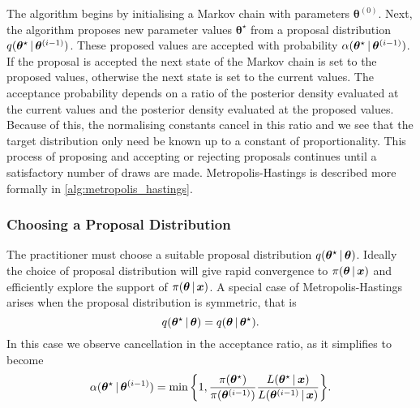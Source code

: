 The algorithm begins by initialising a Markov chain with parameters $\bm{\theta}^{(0)}$.
Next, the algorithm proposes new parameter values $\bm{\theta}^\star$ from a proposal
distribution $q(\bm{\theta}^\star \,|\, \bm{\theta}^{(i-1)})$. These proposed values are
accepted with probability $\alpha(\bm{\theta}^\star \,|\, \bm{\theta}^{(i-1)})$.  If the
proposal is accepted the next state of the Markov chain is set to the proposed values,
otherwise the next state is set to the current values.  The acceptance probability depends
on a ratio of the posterior density evaluated at the current values and the posterior
density evaluated at the proposed values.  Because of this, the normalising constants
cancel in this ratio and we see that the target distribution only need be
known up to a constant of proportionality.  This process of proposing and accepting or
rejecting proposals continues until a satisfactory number of draws are made.
Metropolis-Hastings is described more formally in \cref{alg:metropolis_hastings}.

\subsubsection{Choosing a Proposal Distribution}
\label{ssec:proposal_distribution}

The practitioner must choose a suitable proposal distribution $q(\bm{\theta}^\star \,|\,
\bm{\theta})$. Ideally the choice of proposal distribution will give rapid convergence to
$\pi(\bm{\theta} \,|\, \bm{x})$ and efficiently explore the support of $\pi(\bm{\theta}
\,|\, \bm{x})$. A special case of Metropolis-Hastings arises when the proposal
distribution is symmetric, that is
\begin{equation*}
  q(\bm{\theta}^\star \,|\, \bm{\theta}) = q(\bm{\theta} \,|\, \bm{\theta}^\star).
\end{equation*}
In this case we observe cancellation in the acceptance ratio, as it simplifies to become
\begin{equation*}
  \alpha({\bm{\theta}}^\star \given \bm{\theta}^{(i-1)})
    = \text{min}\,\bigg\{1,
                        \frac{\pi(\bm{\theta}^\star)}{\pi(\bm{\theta}^{(i-1)})}%
                        \frac{L(\bm{\theta}^\star \given \bm{x})}%
                        {L(\bm{\theta}^{(i-1)} \given \bm{x})}
                  \bigg\}.
\end{equation*}

